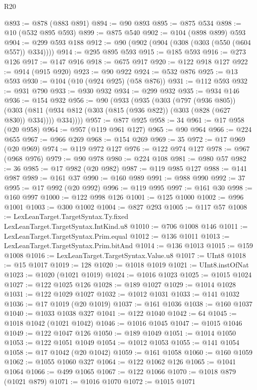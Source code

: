 \begin{lexlean}{R20}
\begin{coremodule}
@893 := @878 (@883 @891)
@894 := @90 @893
@895 := @875 @534
@898 := @10 (@532 @895 @593)
@899 := @875 @540
@902 := @104 (@898 @899) @593
@904 := @299 @593 @188
@912 := @90 (@902 (@904 (@308 (@303 (@550 (@604 @557)) @334))))
@914 := @295 @895 @593
@915 := @185 @593
@916 := @273 @126
@917 := @147 @916
@918 := @675 @917
@920 := @122 @918 @127
@922 := @914 (@915 @920)
@923 := @90 @922
@924 := @532 @876
@925 := @13 @593
@930 := @104 (@10 (@924 @925) (@58 @876))
@931 := @112 @593
@932 := @931 @790
@933 := @930 @932
@934 := @299 @932
@935 := @934 @146
@936 := @154 @932
@956 := @90
    (@933
      (@935
        (@303
          (@797 (@936 @805))
          (@303 (@811 (@934 @812 (@303 (@815 (@936 @822)) (@303 (@828 (@627 @830)) @334)))) @334))))
@957 := @877 @925
@958 := 34
@961 := @17 @958 (@20 @958)
@964 := @957 (@119 @961 @127)
@965 := @90 @964
@966 := @224 @655
@967 := @966 @269
@968 := @154 @269
@969 := 35
@972 := @17 @969 (@20 @969)
@974 := @119 @972 @127
@976 := @122 @974 @127
@978 := @967 (@968 @976)
@979 := @90 @978
@980 := @224 @108
@981 := @980 @57
@982 := 36
@985 := @17 @982 (@20 @982)
@987 := @119 @985 @127
@988 := @141 @987
@989 := @161 @37
@990 := @160 @989
@991 := @988 @990
@992 := 37
@995 := @17 @992 (@20 @992)
@996 := @119 @995
@997 := @161 @30
@998 := @160 @997
@1000 := @122 @998 @126
@1001 := @125 @1000
@1002 := @996 @1001
@1003 := @300 @1002
@1004 := @827 @293
@1005 := @117 @57
@1008 := LexLeanTarget.TargetSyntax.Ty.fixed LexLeanTarget.TargetSyntax.IntKind.u8
@1010 := @706 @1008 @146
@1011 := LexLeanTarget.TargetSyntax.Prim.equal
@1012 := @136 @1011
@1013 := LexLeanTarget.TargetSyntax.Prim.bitAnd
@1014 := @136 @1013
@1015 := @159 @1008
@1016 := LexLeanTarget.TargetSyntax.Value.u8
@1017 := UInt8
@1018 := @15 @1017
@1019 := 128
@1020 := @1018 @1019
@1021 := UInt8.instOfNat
@1023 := @1020 (@1021 @1019)
@1024 := @1016 @1023
@1025 := @1015 @1024
@1027 := @122 @1025 @126
@1028 := @189 @1027
@1029 := @1014 @1028
@1031 := @122 @1029 @1027
@1032 := @1012 @1031
@1033 := @141 @1032
@1036 := @17 @1019 (@20 @1019)
@1037 := @161 @1036
@1038 := @160 @1037
@1040 := @1033 @1038 @327
@1041 := @122 @1040
@1042 := 64
@1045 := @1018 @1042 (@1021 @1042)
@1046 := @1016 @1045
@1047 := @1015 @1046
@1049 := @122 @1047 @126
@1050 := @189 @1049
@1051 := @1014 @1050
@1053 := @122 @1051 @1049
@1054 := @1012 @1053
@1055 := @141 @1054
@1058 := @17 @1042 (@20 @1042)
@1059 := @161 @1058
@1060 := @160 @1059
@1062 := @1055 @1060 @327
@1064 := @122 @1062 @126
@1065 := @1041 @1064
@1066 := @499 @1065
@1067 := @122 @1066
@1070 := @1018 @879 (@1021 @879)
@1071 := @1016 @1070
@1072 := @1015 @1071

\end{coremodule}
\end{lexlean}
